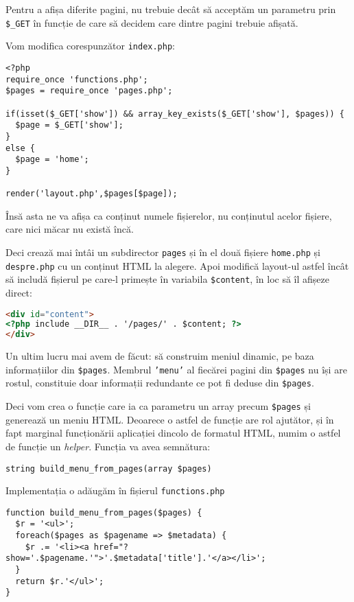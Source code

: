 Pentru a afișa diferite pagini, nu trebuie decât să acceptăm un
parametru prin \texttt{\$\_GET} în funcție de care să
decidem care dintre pagini trebuie afișată.


Vom modifica corespunzător \texttt{index.php}:

\begin{lstlisting}[title=index.php]
<?php
require_once 'functions.php';
$pages = require_once 'pages.php';

if(isset($_GET['show']) && array_key_exists($_GET['show'], $pages)) {
  $page = $_GET['show'];
}
else {
  $page = 'home';
}

render('layout.php',$pages[$page]);
\end{lstlisting}
Însă asta ne va afișa ca conținut numele fișierelor, nu conținutul acelor
fișiere, care nici măcar nu există încă.

Deci crează mai întâi un subdirector \texttt{pages} și în el două fișiere
\texttt{home.php} și \texttt{despre.php} cu un conținut HTML
la alegere. Apoi modifică layout-ul astfel încât să includă fișierul
pe care-l primește în variabila \texttt{\$content}, în loc să îl afișeze
direct:
\begin{lstlisting}[numbers=none,language=html]
<div id="content">
<?php include __DIR__ . '/pages/' . $content; ?>
</div>
\end{lstlisting}

Un ultim lucru mai avem de făcut: să construim meniul dinamic,
pe baza informațiilor din \texttt{\$pages}. Membrul \texttt{'menu'}
al fiecărei pagini din \texttt{\$pages} nu își are rostul, constituie
doar informații redundante ce pot fi deduse din \texttt{\$pages}.

Deci vom crea o funcție care ia ca parametru un array precum \texttt{\$pages}
și generează un meniu HTML. Deoarece o astfel de funcție
are rol ajutător, și în fapt marginal funcționării aplicației
dincolo de formatul HTML, numim o astfel de funcție un \textsl{helper}.
Funcția va avea semnătura:
\begin{verbatim}
string build_menu_from_pages(array $pages)
\end{verbatim}
Implementația o adăugăm în fișierul \texttt{functions.php}
\begin{lstlisting}[numbers=none,title=functions.php]
function build_menu_from_pages($pages) {
  $r = '<ul>';
  foreach($pages as $pagename => $metadata) {
	$r .= '<li><a href="?show='.$pagename.'">'.$metadata['title'].'</a></li>';
  }
  return $r.'</ul>';
}
\end{lstlisting}

